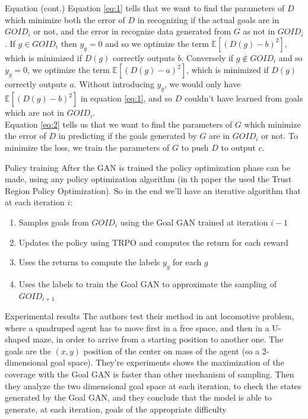 \documentclass{beamer}
\begin{document}
	\begin{frame}{Equation (cont.)}
		Equation \ref{eq:1} tells that we want to find the parameters of $D$ which minimize both the error of $D$ in recognizing if the actual goals are in $GOID_i$ or not, and the error in recognize data generated from $G$ as not in $GOID_i$. If $g \in GOID_i$ then $y_g = 0$ and so we optimize the term $\mathbb{E}[(D(g)-b)^2]$, which is minimized if $D(g)$ correctly outputs $b$. Conversely if $g \not \in GOID_i$ and so $y_g = 0$, we optimize the term $\mathbb{E}[(D(g)-a)^2]$, which is minimized if $D(g)$ correctly outputs $a$. Without introducing $y_g$, we would only have $\mathbb{E}[(D(g)-b)^2]$ in equation \ref{eq:1}, and so $D$ couldn't have learned from goals which are not in $GOID_i$.\\
		Equation \ref{eq:2} tells us that we want to find the parameters of $G$ which minimize the error of $D$ in predicting if the goals generated by $G$ are in $GOID_i$ or not. To minimize the loss, we train the parameters of $G$ to push $D$ to output $c$.
	\end{frame}

	\begin{frame}{Policy training}
		After the GAN is trained the policy optimization phase can be made, using any policy optimization algorithm (in th paper the used the Trust Region Policy Optimization). So in the end we'll have an iterative algorithm that at each iteration $i$:
		\begin{enumerate}
			\item Samples goals from $GOID_i$ using the Goal GAN trained at iteration $i-1$
			\item Updates the policy using TRPO and computes the return for each reward
			\item Uses the returns to compute the labels $y_g$ for each $g$
			\item Uses the labels to train the Goal GAN to approximate the sampling of $GOID_{i+1}$
		\end{enumerate}
	\end{frame}

	\begin{frame}{Experimental results}
		\small
		The authors test their method in ant locomotive problem, where a quadruped agent has to move first in a free space, and then in a U-shaped maze, in order to arrive from a starting position to another one. The goals are the $(x,y)$ position of the center on mass of the agent (so a 2-dimensional goal space). They're experiments shows the maximization of the coverage with the Goal GAN is faster than other mechanism of sampling. Then they analyze the two dimensional goal space at each iteration, to check the states generated by the Goal GAN, and they conclude that the model is able to generate, at each iteration, goals of the appropriate difficulty
	\end{frame}
\end{document}
